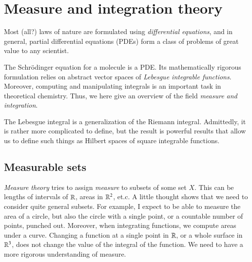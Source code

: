
\chapter{Measure and integration theory}
\label{sec:measure-and-integration}

Most (all?) laws of nature are formulated using \emph{differential equations}, and in general, partial differential equations (PDEs) form a class of problems of great value to any scientist. 

The Schrödinger equation for a molecule is a PDE. Its mathematically rigorous formulation relies on abstract vector spaces of \emph{Lebesgue integrable functions}. Moreover, computing and manipulating integrals is an important task in theoretical chemistry. Thus, we here give an overview of the field \emph{measure and integration}.

The Lebesgue integral is a generalization of the Riemann integral. Admittedly, it is rather more complicated to define, but the result is powerful results that allow us to define such things as Hilbert spaces of square integrable functions.






\section{Measurable sets}

\emph{Measure theory} tries to assign \emph{measure} to subsets of some set $X$. This can be lengths of intervals of $\mathbb{R}$, areas in $\mathbb{R}^2$, et.c. A little thought shows that we need to consider quite general subsets. For example, I expect to be able to measure the area of a circle, but also the circle with a single point, or a countable number of points, punched out. Moreover, when integrating functions, we compute areas under a curve. Changing a function at a single point in $\mathbb{R}$, or a whole surface in $\mathbb{R}^3$, does not change the value of the integral of the function. We need to have a more rigorous understanding of measure.



